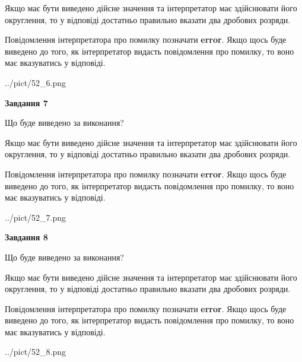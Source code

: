 \documentclass[12pt, ukrainian]{article}
\begin{document}
{\begin {Large}
Якщо має бути виведено дійсне значення та інтерпретатор має здійснювати його округлення, 
то у відповіді достатньо правильно вказати два дробових розряди.

Повідомлення інтерпретатора про помилку позначати \textbf{error}.
Якщо щось буде виведено до того, як інтерпретатор видасть повідомлення про помилку, 
то воно має вказуватись у відповіді. \par

\begin{center}
	{../pict/52_6.png}
\end{center}
\newpage

{\begin {center}\textbf{Завдання 7}\end {center}}\par
Що буде виведено за виконання? \par

Якщо має бути виведено дійсне значення та інтерпретатор має здійснювати його округлення, 
то у відповіді достатньо правильно вказати два дробових розряди.

Повідомлення інтерпретатора про помилку позначати \textbf{error}.
Якщо щось буде виведено до того, як інтерпретатор видасть повідомлення про помилку, 
то воно має вказуватись у відповіді. \par

\begin{center}
	{../pict/52_7.png}
\end{center}
\newpage

{\begin {center}\textbf{Завдання 8}\end {center}}\par
Що буде виведено за виконання? \par

Якщо має бути виведено дійсне значення та інтерпретатор має здійснювати його округлення, 
то у відповіді достатньо правильно вказати два дробових розряди.

Повідомлення інтерпретатора про помилку позначати \textbf{error}.
Якщо щось буде виведено до того, як інтерпретатор видасть повідомлення про помилку, 
то воно має вказуватись у відповіді. \par

\begin{center}
	{../pict/52_8.png}
\end{center}
\newpage


\end{Large}}
\end{document}
